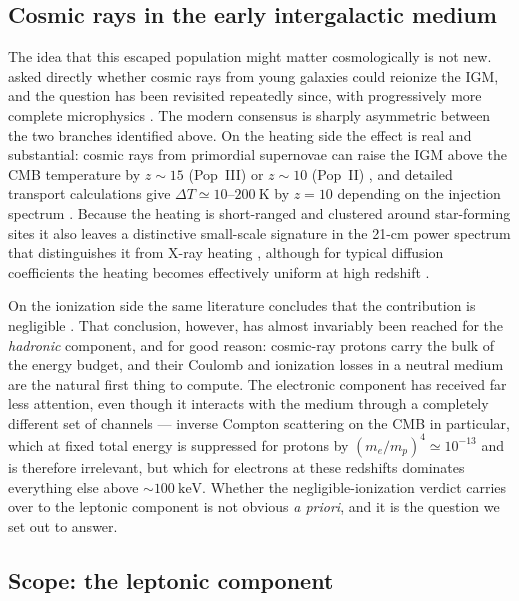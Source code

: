 \documentclass[twocolumn]{article}
\begin{document}
\subsection{Cosmic rays in the early intergalactic medium}

The idea that this escaped population might matter cosmologically is not new.
\citet{Nath1993} asked directly whether cosmic rays from young galaxies could
reionize the IGM, and the question has been revisited repeatedly since, with
progressively more complete microphysics
\citep{Samui2005,Sazonov2015,Leite2017,Jana2018,Bera2023,GesseyJones2023}. The
modern consensus is sharply asymmetric between the two branches identified
above. On the heating side the effect is real and substantial: cosmic rays from
primordial supernovae can raise the IGM above the CMB temperature by
$z \sim 15$ (Pop~III) or $z \sim 10$ (Pop~II) \citep{Sazonov2015}, and
detailed transport calculations give $\Delta T \simeq 10$--$200\ \mathrm{K}$ by
$z = 10$ depending on the injection spectrum \citep{Leite2017}. Because the
heating is short-ranged and clustered around star-forming sites it also leaves
a distinctive small-scale signature in the 21-cm power spectrum that
distinguishes it from X-ray heating \citep{GesseyJones2023}, although for
typical diffusion coefficients the heating becomes effectively uniform at high
redshift \citep{Jana2018}.

On the ionization side the same literature concludes that the contribution is
negligible \citep{Leite2017}. That conclusion, however, has almost invariably
been reached for the \emph{hadronic} component, and for good reason: cosmic-ray
protons carry the bulk of the energy budget, and their Coulomb and ionization
losses in a neutral medium are the natural first thing to compute. The
electronic component has received far less attention, even though it interacts
with the medium through a completely different set of channels --- inverse
Compton scattering on the CMB in particular, which at fixed total energy is
suppressed for protons by $(m_e/m_p)^{4} \simeq 10^{-13}$ and is therefore
irrelevant, but which for electrons at these
redshifts dominates everything else above $\sim\!100\ \mathrm{keV}$. Whether
the negligible-ionization verdict carries over to the leptonic component is not
obvious \emph{a priori}, and it is the question we set out to answer.

\subsection{Scope: the leptonic component}
\end{document}
